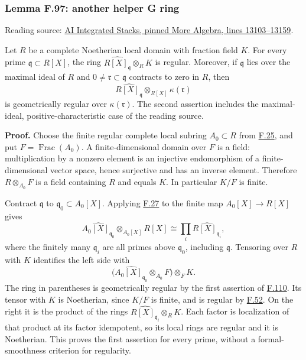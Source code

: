 \documentclass[11pt,a4paper,openany]{report}
\begin{document}
\label{AG-RG-S05-more-algebra-lemma-another-helper-G-ring}

\subsubsection{Lemma F.97: another helper G ring}\label{AG-RG-S05-lemma-f.97-another-helper-g-ring}

Reading source: \href{https://github.com/KokunoYumeto/unofficial-stacks-project-ai-drafts/blob/565b10e987aba5969b21145a0833f42d69f96790/more-algebra.tex\#L13103-L13159}{AI Integrated Stacks, pinned More Algebra, lines 13103--13159}.

Let \(R\) be a complete Noetherian local domain with fraction field \(K\). For every prime \(\mathfrak q\subset R[X]\), the ring \(\widehat{R[X]_{\mathfrak q}}\otimes_RK\) is regular. Moreover, if \(\mathfrak q\) lies over the maximal ideal of \(R\) and \(0\ne\mathfrak r\subset\mathfrak q\) contracts to zero in \(R\), then \[\widehat{R[X]_{\mathfrak q}}\otimes_{R[X]}\kappa(\mathfrak r)\] is geometrically regular over \(\kappa(\mathfrak r)\). The second assertion includes the maximal-ideal, positive-characteristic case of the reading source.

\textbf{Proof.} Choose the finite regular complete local subring \(A_0\subset R\) from \hyperref[AG-RG-S05-algebra-lemma-complete-local-Noetherian-domain-finite-over-regular]{F.25}, and put \(F=\operatorname{Frac}(A_0)\). A finite-dimensional domain over \(F\) is a field: multiplication by a nonzero element is an injective endomorphism of a finite-dimensional vector space, hence surjective and has an inverse element. Therefore \(R\otimes_{A_0}F\) is a field containing \(R\) and equals \(K\). In particular \(K/F\) is finite.

Contract \(\mathfrak q\) to \(\mathfrak q_0\subset A_0[X]\). Applying \hyperref[AG-RG-S05-algebra-lemma-completion-finite-extension]{F.27} to the finite map \(A_0[X]\to R[X]\) gives \[\widehat{A_0[X]_{\mathfrak q_0}}\otimes_{A_0[X]}R[X]
\cong\prod_i\widehat{R[X]_{\mathfrak q_i}},\] where the finitely many \(\mathfrak q_i\) are all primes above \(\mathfrak q_0\), including \(\mathfrak q\). Tensoring over \(R\) with \(K\) identifies the left side with \[\bigl(\widehat{A_0[X]_{\mathfrak q_0}}\otimes_{A_0}F\bigr)\otimes_FK.\] The ring in parentheses is geometrically regular by the first assertion of \hyperref[AG-RG-S05-more-algebra-lemma-helper-G-ring]{F.110}. Its tensor with \(K\) is Noetherian, since \(K/F\) is finite, and is regular by \hyperref[AG-RG-S05-algebra-lemma-geometrically-regular-over-subfields]{F.52}. On the right it is the product of the rings \(\widehat{R[X]_{\mathfrak q_i}}\otimes_RK\). Each factor is localization of that product at its factor idempotent, so its local rings are regular and it is Noetherian. This proves the first assertion for every prime, without a formal-smoothness criterion for regularity.
\end{document}
